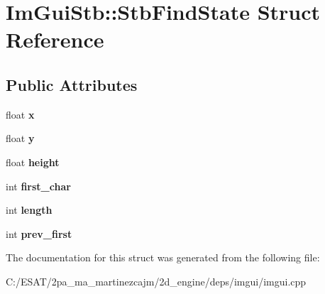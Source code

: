 \hypertarget{struct_im_gui_stb_1_1_stb_find_state}{}\section{Im\+Gui\+Stb\+:\+:Stb\+Find\+State Struct Reference}
\label{struct_im_gui_stb_1_1_stb_find_state}
\subsection*{Public Attributes}
\begin{DoxyCompactItemize}
\item 
\mbox{\label{struct_im_gui_stb_1_1_stb_find_state_a391de227ff11c00c2726988aed6fe5d6}} 
float {\bfseries x}
\item 
\mbox{\label{struct_im_gui_stb_1_1_stb_find_state_a16d674ba203b37cecd265f02bc679449}} 
float {\bfseries y}
\item 
\mbox{\label{struct_im_gui_stb_1_1_stb_find_state_a4bdad2788ba8c8785c8961e14e2529ac}} 
float {\bfseries height}
\item 
\mbox{\label{struct_im_gui_stb_1_1_stb_find_state_a6ad39fc199ae5e89b565a6abf35fefd7}} 
int {\bfseries first\+\_\+char}
\item 
\mbox{\label{struct_im_gui_stb_1_1_stb_find_state_a255b330cee989cac3fea58afd6f08c3d}} 
int {\bfseries length}
\item 
\mbox{\label{struct_im_gui_stb_1_1_stb_find_state_ab0dbf2d67355b0454427a5c811c5174f}} 
int {\bfseries prev\+\_\+first}
\end{DoxyCompactItemize}


The documentation for this struct was generated from the following file\+:\begin{DoxyCompactItemize}
\item 
C\+:/\+E\+S\+A\+T/2pa\+\_\+ma\+\_\+martinezcajm/2d\+\_\+engine/deps/imgui/imgui.\+cpp\end{DoxyCompactItemize}
